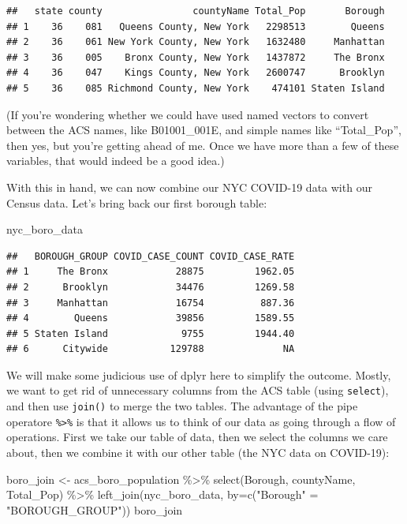 \documentclass[
  openany]{book}
\newenvironment{Shaded}{\begin{snugshade}}{\end{snugshade}}
\newcommand{\AttributeTok}[1]{\textcolor[rgb]{0.77,0.63,0.00}{#1}}
\newcommand{\FunctionTok}[1]{\textcolor[rgb]{0.00,0.00,0.00}{#1}}
\newcommand{\NormalTok}[1]{#1}
\newcommand{\OtherTok}[1]{\textcolor[rgb]{0.56,0.35,0.01}{#1}}
\newcommand{\SpecialCharTok}[1]{\textcolor[rgb]{0.00,0.00,0.00}{#1}}
\newcommand{\StringTok}[1]{\textcolor[rgb]{0.31,0.60,0.02}{#1}}
\begin{document}
\begin{verbatim}
##   state county                countyName Total_Pop       Borough
## 1    36    081   Queens County, New York   2298513        Queens
## 2    36    061 New York County, New York   1632480     Manhattan
## 3    36    005    Bronx County, New York   1437872     The Bronx
## 4    36    047    Kings County, New York   2600747      Brooklyn
## 5    36    085 Richmond County, New York    474101 Staten Island
\end{verbatim}

(If you're wondering whether we could have used named vectors to convert between the ACS names, like B01001\_001E, and simple names like ``Total\_Pop'', then yes, but you're getting ahead of me. Once we have more than a few of these variables, that would indeed be a good idea.)

With this in hand, we can now combine our NYC COVID-19 data with our Census data. Let's bring back our first borough table:

\begin{Shaded}
\begin{Highlighting}[]
\NormalTok{nyc\_boro\_data}
\end{Highlighting}
\end{Shaded}

\begin{verbatim}
##   BOROUGH_GROUP COVID_CASE_COUNT COVID_CASE_RATE
## 1     The Bronx            28875         1962.05
## 2      Brooklyn            34476         1269.58
## 3     Manhattan            16754          887.36
## 4        Queens            39856         1589.55
## 5 Staten Island             9755         1944.40
## 6      Citywide           129788              NA
\end{verbatim}

We will make some judicious use of dplyr here to simplify the outcome. Mostly, we want to get rid of unnecessary columns from the ACS table (using \texttt{select}), and then use \texttt{join()} to merge the two tables. The advantage of the pipe operatore \texttt{\%\textgreater{}\%} is that it allows us to think of our data as going through a flow of operations. First we take our table of data, then we select the columns we care about, then we combine it with our other table (the NYC data on COVID-19):

\begin{Shaded}
\begin{Highlighting}[]
\NormalTok{boro\_join }\OtherTok{\textless{}{-}}\NormalTok{ acs\_boro\_population }\SpecialCharTok{\%\textgreater{}\%} \FunctionTok{select}\NormalTok{(Borough, countyName, Total\_Pop) }\SpecialCharTok{\%\textgreater{}\%}
  \FunctionTok{left\_join}\NormalTok{(nyc\_boro\_data, }\AttributeTok{by=}\FunctionTok{c}\NormalTok{(}\StringTok{"Borough"} \OtherTok{=}  \StringTok{"BOROUGH\_GROUP"}\NormalTok{))}
\NormalTok{boro\_join}
\end{Highlighting}
\end{Shaded}
\end{document}
